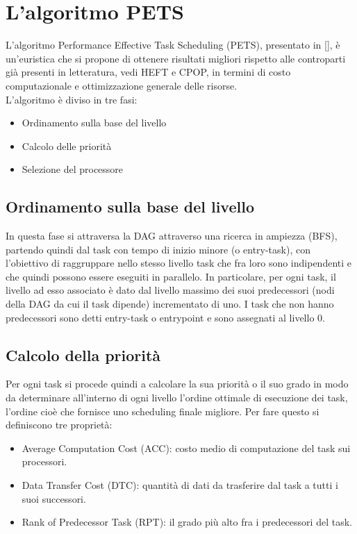 \chapter{L'algoritmo PETS}
\vspace{4cm}
L'algoritmo Performance Effective Task Scheduling (PETS), presentato in [], è un'euristica che si propone di ottenere risultati migliori rispetto alle controparti già presenti in letteratura, vedi HEFT e CPOP, in termini di costo computazionale e ottimizzazione generale delle risorse.
\\
L'algoritmo è diviso in tre fasi:
\begin{itemize}
	\item Ordinamento sulla base del livello
	\item Calcolo delle priorità
	\item Selezione del processore 
\end{itemize}

\newpage

\section{Ordinamento sulla base del livello}
In questa fase si attraversa la DAG attraverso una ricerca in ampiezza (BFS), partendo quindi dal task con tempo di inizio minore (o entry-task), con l'obiettivo di raggruppare nello stesso livello task che fra loro sono indipendenti e che quindi possono essere eseguiti in parallelo.
In particolare, per ogni task, il livello ad esso associato è dato dal livello massimo dei suoi predecessori (nodi della DAG da cui il task dipende) incrementato di uno. I task che non hanno predecessori sono detti entry-task o entrypoint e sono assegnati al livello 0.


\section{Calcolo della priorità}
Per ogni task si procede quindi a calcolare la sua priorità o il suo grado in modo da determinare all'interno di ogni livello l'ordine ottimale di esecuzione dei task, l'ordine cioè che fornisce uno scheduling finale migliore.
Per fare questo si definiscono tre proprietà:
\begin{itemize}
	\item Average Computation Cost (ACC): costo medio di computazione del task sui processori.
	\item Data Transfer Cost (DTC): quantità di dati da trasferire dal task a tutti i suoi successori.
	\item Rank of Predecessor Task (RPT): il grado più alto fra i predecessori del task.
\end{itemize}

